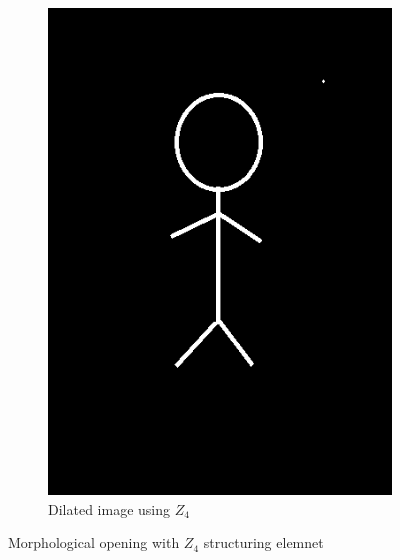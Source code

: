 \documentclass[a4paper]{article}
\begin{document}
\begin{figure}[htp]
\begin{subfigure}{.33\textwidth}
  \includegraphics[width=.9\linewidth]{ex2-dilation-z4.png}
  \caption{Dilated image using $Z_4$}
  \label{fig:sub2}
\end{subfigure}
\caption{Morphological opening with $Z_4$ structuring elemnet}
\label{fig:test}
\end{figure}
\end{document}

